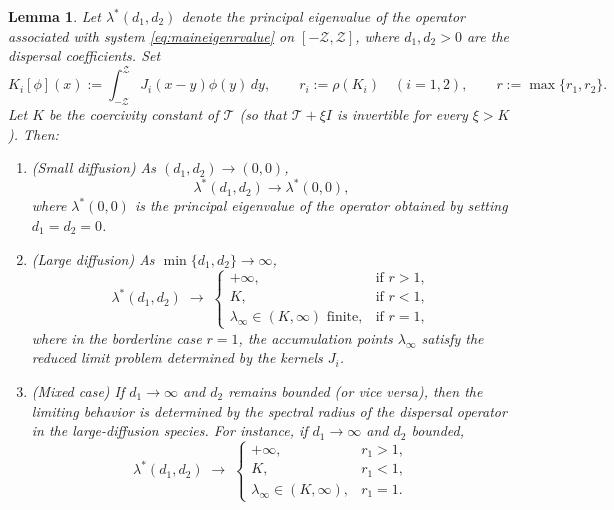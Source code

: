 \documentclass[a4paper,11pt]{amsart}
\newtheorem{lemma}[theorem]{Lemma}
\theoremstyle{definition}
\numberwithin{equation}{section}
\theoremstyle{definition}
\begin{document}
\begin{lemma}\label{lem:limit_d1d2}
Let $\lambda^\ast(d_1,d_2)$ denote the principal eigenvalue of the operator associated with system \eqref{eq:maineigenrvalue} on $[-\mathcal{Z},\mathcal{Z}]$, where $d_1,d_2>0$ are the dispersal coefficients.
Set
\[
K_i[\phi](x):=\int_{-\mathcal{Z}}^{\mathcal{Z}} J_i(x-y)\phi(y)\,dy,\qquad
r_i:=\rho(K_i)\quad (i=1,2),
\qquad r:=\max\{r_1,r_2\}.
\]
Let $K$ be the coercivity constant of $\mathscr{T}$ (so that $\mathscr{T}+\xi I$ is invertible for every $\xi>K$). Then:
\begin{enumerate}
    \item (\emph{Small diffusion}) As $(d_1,d_2)\to(0,0)$,
    \[
    \lambda^\ast(d_1,d_2)\longrightarrow \lambda^\ast(0,0),
    \]
    where $\lambda^\ast(0,0)$ is the principal eigenvalue of the operator obtained by setting $d_1=d_2=0$.

    \item (\emph{Large diffusion}) As $\min\{d_1,d_2\}\to\infty$,
    \[
    \lambda^\ast(d_1,d_2)\;\longrightarrow\;
    \begin{cases}
      +\infty, & \text{if } r>1,\\[4pt]
      K, & \text{if } r<1,\\[4pt]
      \lambda_\infty\in(K,\infty) \text{ finite}, & \text{if } r=1,
    \end{cases}
    \]
    where in the borderline case $r=1$, the accumulation points $\lambda_\infty$ satisfy the reduced limit problem determined by the kernels $J_i$.

    \item (\emph{Mixed case}) If $d_1\to\infty$ and $d_2$ remains bounded (or vice versa), then the limiting behavior is determined by the spectral radius of the dispersal operator in the large-diffusion species. For instance, if $d_1\to\infty$ and $d_2$ bounded,
    \[
    \lambda^\ast(d_1,d_2)\;\longrightarrow\;
    \begin{cases}
      +\infty, & r_1>1,\\[4pt]
      K, & r_1<1,\\[4pt]
      \lambda_\infty\in(K,\infty), & r_1=1.
    \end{cases}
    \]
\end{enumerate}
\end{lemma}
\end{document}

